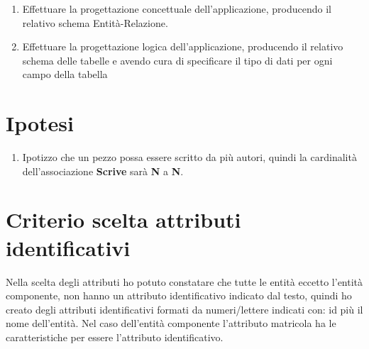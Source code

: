 \documentclass[12pt]{article}
\begin{document}
\begin{enumerate}
    \item Effettuare la progettazione concettuale dell’applicazione, producendo il relativo schema Entità-Relazione.
    
    \item Effettuare la progettazione logica dell’applicazione, producendo il relativo schema delle tabelle e avendo cura di specificare il tipo di dati per ogni campo della tabella
    
\end{enumerate}

\clearpage 


\renewcommand{\contentsname}{Indice \label{indice}}
\tableofcontents

\renewcommand{\listfigurename}{Lista delle figure}
\listoffigures

\renewcommand{\listtablename}{Liste Attributi}
\listoftables

\clearpage


\section{Ipotesi}

\begin{enumerate}
    \item Ipotizzo che un pezzo possa essere scritto da più autori, quindi la cardinalità  dell'associazione \textbf{Scrive} sarà \textbf{N} a \textbf{N}.
\end{enumerate}


\section{Criterio scelta attributi identificativi}

\noindent
Nella scelta degli attributi ho potuto constatare che tutte le entità eccetto l'entità componente, non hanno un attributo identificativo indicato dal testo, quindi ho creato degli attributi identificativi formati da numeri/lettere indicati con: id più il nome dell'entità. Nel caso dell'entità componente l'attributo matricola ha le caratteristiche per essere l'attributo identificativo.
\end{document}
